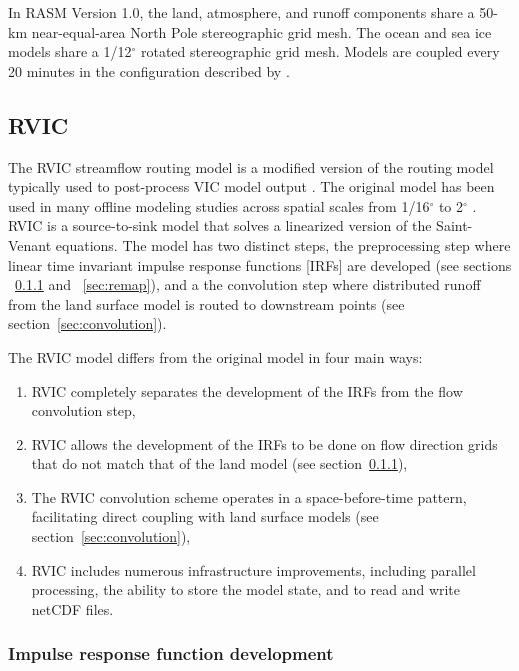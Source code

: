 \documentclass[jgrga, draft]{agutex}
\begin{document}
\begin{article}
In RASM Version 1.0, the land, atmosphere, and runoff components share a 50-km near-equal-area North Pole stereographic grid mesh.
The ocean and sea ice models share a 1/12$^{\circ}$ rotated stereographic grid mesh.
Models are coupled every 20 minutes in the configuration described by \citet{Roberts_2015a}.

\subsection{RVIC}
\label{sec:rvic}

The RVIC streamflow routing model is a modified version of the routing model typically used to post-process VIC model output \citep{Lohmann_1996, Lohmann_1998a}.
The original \citet{Lohmann_1996} model has been used in many offline modeling studies across spatial scales from 1/16$^{\circ}$ to 2$^{\circ}$ \citep[.e.g.][]{Nijssen_1997,Lohmann_1998b,Su_2005}.
RVIC is a source-to-sink model that solves a linearized version of the Saint-Venant equations.
The model has two distinct steps, the preprocessing step where linear time invariant impulse response functions [IRFs] are developed (see sections ~\ref{sec:irfs} and ~\ref{sec:remap}), and a the convolution step where distributed runoff from the land surface model is routed to downstream points (see section~\ref{sec:convolution}).

The RVIC model differs from the original \citet{Lohmann_1996} model in four main ways:

\begin{enumerate}
\item RVIC completely separates the development of the IRFs from the flow convolution step,
\item RVIC allows the development of the IRFs to be done on flow direction grids that do not match that of the land model (see section~\ref{sec:irfs}),
\item The RVIC convolution scheme operates in a space-before-time pattern, facilitating direct coupling with land surface models (see section~\ref{sec:convolution}),
\item RVIC includes numerous infrastructure improvements, including parallel processing, the ability to store the model state, and to read and write netCDF files.
\end{enumerate}

\subsubsection{Impulse response function development}
\label{sec:irfs}


\end{article}
\end{document}

